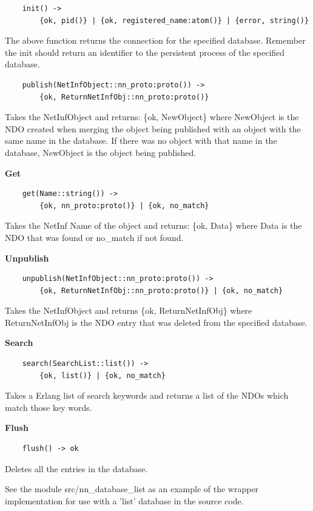 \begin {verbatim}
    init() -> 
    	{ok, pid()} | {ok, registered_name:atom()} | {error, string()}
\end{verbatim}

The above function returns the connection for the specified database.
Remember the init should return an identifier to the persistent process of the specified database.

\begin {verbatim}
    publish(NetInfObject::nn_proto:proto()) -> 
    	{ok, ReturnNetInfObj::nn_proto:proto()}
\end{verbatim}

Takes the NetInfObject and returns: \{ok, NewObject\} where NewObject is the NDO created when merging the object being published with an object with the same name in the database. If there was no object with that name in the database, NewObject is the object being published.

\textbf{Get}

\begin {verbatim}
    get(Name::string()) -> 
    	{ok, nn_proto:proto()} | {ok, no_match}
\end{verbatim}

Takes the NetInf Name of the object and returns: \{ok, Data\} where Data is the NDO that was found or no\_match if not found.

\textbf{Unpublish}

\begin {verbatim}
    unpublish(NetInfObject::nn_proto:proto()) -> 
    	{ok, ReturnNetInfObj::nn_proto:proto()} | {ok, no_match}
\end{verbatim}

Takes the NetInfObject and returns \{ok, ReturnNetInfObj\} where ReturnNetInfObj is the NDO entry that was deleted from the specified database.

\textbf{Search}

\begin {verbatim}
    search(SearchList::list()) -> 
    	{ok, list()} | {ok, no_match}
\end{verbatim}

Takes a Erlang list of search keywords and returns a list of the NDOs which match those key words.

\textbf{Flush}

\begin {verbatim}
	flush() -> ok
\end{verbatim}

Deletes all the entries in the database.   

See the module src/nn\_database\_list as an example of the wrapper implementation for use with a 'list' database in the source code.

